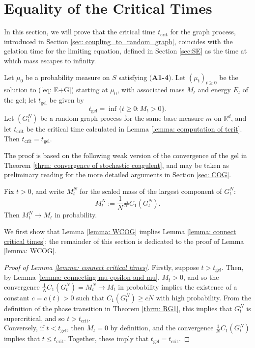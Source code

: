 \section{Equality of the Critical Times} \label{sec: ECT}

In this section, we will prove that the critical time $t_\mathrm{crit}$ for the graph process, introduced in Section \ref{sec: coupling_to_random_graph}, coincides with the gelation time for the limiting equation, defined in Section \ref{sec:SE} as the time at which mass escapes to infinity. 
\begin{lemma}\label{lemma: connect critical times} Let $\mu_0$ be a probability measure on $S$ satisfying (\textbf{A1-4}). Let $(\mu_t)_{t\ge 0}$ be the solution to (\ref{eq: E+G}) starting at $\mu_0$, with associated mass $M_t$ and energy $E_t$ of the gel; let $t_\mathrm{gel}$ be given by \begin{equation}
    t_\mathrm{gel}=\inf\{t\ge 0: M_t>0\}.
\end{equation} Let $(G^N_t)$ be a random graph process for the same base measure $m$ on $\mathbb{R}^d$, and let $t_\mathrm{crit}$ be the critical time calculated in Lemma \ref{lemma: computation of tcrit}. Then $t_\mathrm{crit}=t_\mathrm{gel}$. \end{lemma}
The proof is based on the following weak version of the convergence of the gel in Theorem \ref{thrm: convergence of stochastic coagulent}, and may be taken as preliminary reading for the more detailed arguments in Section \ref{sec: COG}. \begin{lemma} \label{lemma: WCOG} Fix $t>0$, and write $M^N_t$ for the scaled mass of the largest component of $G^N_t$: \begin{equation} M^N_t:=\frac{1}{N}\#C_1(G^N_t). \end{equation} Then $M^N_t\rightarrow M_t$ in probability. \end{lemma} We first show that Lemma \ref{lemma: WCOG} implies Lemma \ref{lemma: connect critical times}; the remainder of this section is dedicated to the proof of Lemma \ref{lemma: WCOG}. \begin{proof}[Proof of Lemma \ref{lemma: connect critical times}] Firstly, suppose $t>t_\mathrm{gel}$. Then, by Lemma \ref{lemma: connecting mu-epsilon and mu}, $M_t>0$, and so the convergence $\frac{1}{N}C_1(G^N_t)=M^N_t\rightarrow M_t$ in probability implies the existence of a constant $c=c(t)>0$ such that $C_1(G^N_t)\ge cN$ with high probability. From the definition of the phase transition in Theorem \ref{thrm: RG1}, this implies that $G^N_t$ is supercritical, and so $t>t_\mathrm{crit}$. \medskip \\ Conversely, if $t< t_\mathrm{gel}$, then $M_t=0$ by definition, and the convergence $\frac{1}{N}C_1(G^N_t)$ implies that $t\le t_\mathrm{crit}$. Together, these imply that $t_\mathrm{gel}=t_\mathrm{crit}.$  \end{proof} 
